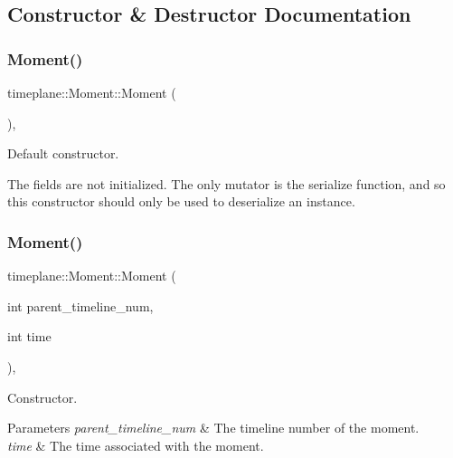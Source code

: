 \subsection{Constructor \& Destructor Documentation}
\mbox{\label{classtimeplane_1_1_moment_a5eecc085ee6010fa5079ddea4e79d6cb}} 
\subsubsection{\texorpdfstring{Moment()}{Moment()}\hspace{0.1cm}{\footnotesize\ttfamily [1/2]}}
{\footnotesize\ttfamily timeplane\+::\+Moment\+::\+Moment (\begin{DoxyParamCaption}{ }\end{DoxyParamCaption})\hspace{0.3cm}{\ttfamily [inline]}, {\ttfamily [noexcept]}}



Default constructor. 

The fields are not initialized. The only mutator is the {\ttfamily serialize} function, and so this constructor should only be used to deserialize an instance. \mbox{\label{classtimeplane_1_1_moment_a33106530bbe889016479d1443d592571}} 
\subsubsection{\texorpdfstring{Moment()}{Moment()}\hspace{0.1cm}{\footnotesize\ttfamily [2/2]}}
{\footnotesize\ttfamily timeplane\+::\+Moment\+::\+Moment (\begin{DoxyParamCaption}\item[{int}]{parent\+\_\+timeline\+\_\+num,  }\item[{int}]{time }\end{DoxyParamCaption})\hspace{0.3cm}{\ttfamily [inline]}, {\ttfamily [noexcept]}}



Constructor. 


\begin{DoxyParams}{Parameters}
{\em parent\+\_\+timeline\+\_\+num} & The timeline number of the moment. \\
\hline
{\em time} & The time associated with the moment. \\
\hline
\end{DoxyParams}


